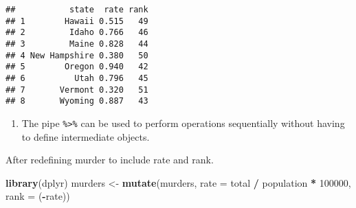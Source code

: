 \documentclass[]{article}
\newenvironment{Shaded}{\begin{snugshade}}{\end{snugshade}}
\newcommand{\CommentTok}[1]{\textcolor[rgb]{0.56,0.35,0.01}{\textit{#1}}}
\newcommand{\DataTypeTok}[1]{\textcolor[rgb]{0.13,0.29,0.53}{#1}}
\newcommand{\DecValTok}[1]{\textcolor[rgb]{0.00,0.00,0.81}{#1}}
\newcommand{\KeywordTok}[1]{\textcolor[rgb]{0.13,0.29,0.53}{\textbf{#1}}}
\newcommand{\NormalTok}[1]{#1}
\newcommand{\OperatorTok}[1]{\textcolor[rgb]{0.81,0.36,0.00}{\textbf{#1}}}
\newcommand{\StringTok}[1]{\textcolor[rgb]{0.31,0.60,0.02}{#1}}
\providecommand{\tightlist}{%
  \setlength{\itemsep}{0pt}\setlength{\parskip}{0pt}}
\begin{document}
\begin{Shaded}
\end{Shaded}

\begin{verbatim}
##           state  rate rank
## 1        Hawaii 0.515   49
## 2         Idaho 0.766   46
## 3         Maine 0.828   44
## 4 New Hampshire 0.380   50
## 5        Oregon 0.940   42
## 6          Utah 0.796   45
## 7       Vermont 0.320   51
## 8       Wyoming 0.887   43
\end{verbatim}

\begin{enumerate}
\def\labelenumi{\arabic{enumi}.}
\setcounter{enumi}{7}
\tightlist
\item
  The pipe \texttt{\%\textgreater{}\%} can be used to perform operations
  sequentially without having to define intermediate objects.
\end{enumerate}

After redefining murder to include rate and rank.

\begin{Shaded}
\begin{Highlighting}[]
\KeywordTok{library}\NormalTok{(dplyr)}
\NormalTok{murders <-}\StringTok{ }\KeywordTok{mutate}\NormalTok{(murders, }\DataTypeTok{rate =}\NormalTok{ total }\OperatorTok{/}\StringTok{ }\NormalTok{population }\OperatorTok{*}\StringTok{ }\DecValTok{100000}\NormalTok{, }\DataTypeTok{rank =}\NormalTok{ (}\OperatorTok{-}\NormalTok{rate))}
\end{Highlighting}
\end{Shaded}
\end{document}
